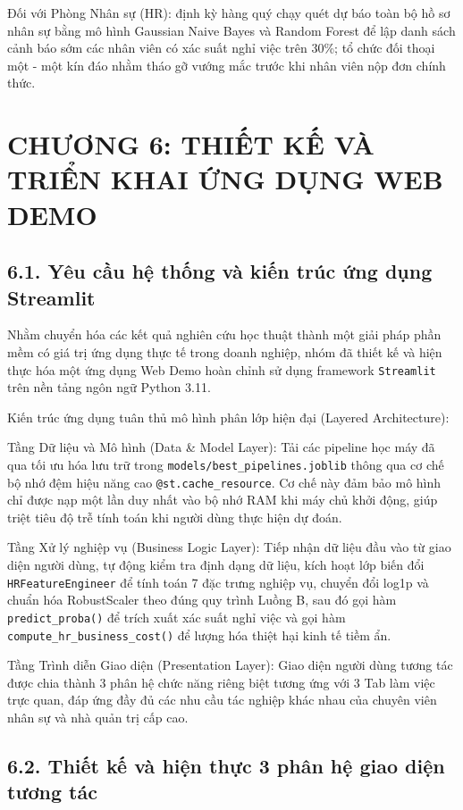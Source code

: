 \documentclass[12pt,a4paper]{article}
\begin{document}
Đối với Phòng Nhân sự (HR): định kỳ hàng quý chạy quét dự báo toàn bộ hồ sơ nhân sự bằng mô hình Gaussian Naive Bayes và Random Forest để lập danh sách cảnh báo sớm các nhân viên có xác suất nghỉ việc trên 30\%; tổ chức đối thoại một - một kín đáo nhằm tháo gỡ vướng mắc trước khi nhân viên nộp đơn chính thức.


\newpage
\section{CHƯƠNG 6: THIẾT KẾ VÀ TRIỂN KHAI ỨNG DỤNG WEB DEMO}

\subsection{6.1. Yêu cầu hệ thống và kiến trúc ứng dụng Streamlit}
Nhằm chuyển hóa các kết quả nghiên cứu học thuật thành một giải pháp phần mềm có giá trị ứng dụng thực tế trong doanh nghiệp, nhóm đã thiết kế và hiện thực hóa một ứng dụng Web Demo hoàn chỉnh sử dụng framework \texttt{Streamlit} trên nền tảng ngôn ngữ Python 3.11.

Kiến trúc ứng dụng tuân thủ mô hình phân lớp hiện đại (Layered Architecture):

Tầng Dữ liệu và Mô hình (Data \& Model Layer): Tải các pipeline học máy đã qua tối ưu hóa lưu trữ trong \texttt{models/best\_pipelines.joblib} thông qua cơ chế bộ nhớ đệm hiệu năng cao \texttt{@st.cache\_resource}. Cơ chế này đảm bảo mô hình chỉ được nạp một lần duy nhất vào bộ nhớ RAM khi máy chủ khởi động, giúp triệt tiêu độ trễ tính toán khi người dùng thực hiện dự đoán.

Tầng Xử lý nghiệp vụ (Business Logic Layer): Tiếp nhận dữ liệu đầu vào từ giao diện người dùng, tự động kiểm tra định dạng dữ liệu, kích hoạt lớp biến đổi \texttt{HRFeatureEngineer} để tính toán 7 đặc trưng nghiệp vụ, chuyển đổi log1p và chuẩn hóa RobustScaler theo đúng quy trình Luồng B, sau đó gọi hàm \texttt{predict\_proba()} để trích xuất xác suất nghỉ việc và gọi hàm \texttt{compute\_hr\_business\_cost()} để lượng hóa thiệt hại kinh tế tiềm ẩn.

Tầng Trình diễn Giao diện (Presentation Layer): Giao diện người dùng tương tác được chia thành 3 phân hệ chức năng riêng biệt tương ứng với 3 Tab làm việc trực quan, đáp ứng đầy đủ các nhu cầu tác nghiệp khác nhau của chuyên viên nhân sự và nhà quản trị cấp cao.

\subsection{6.2. Thiết kế và hiện thực 3 phân hệ giao diện tương tác}
\end{document}
